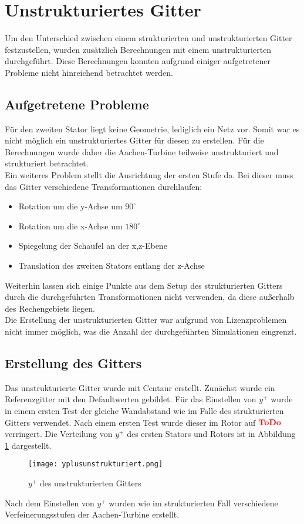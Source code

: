 \section{Unstrukturiertes Gitter}
Um den Unterschied zwischen einem strukturierten und unstrukturierten Gitter festzustellen, wurden zusätzlich Berechnungen mit einem unstrukturierten durchgeführt. Diese Berechnungen konnten aufgrund einiger aufgetretener Probleme nicht hinreichend betrachtet werden.

\subsection{Aufgetretene Probleme}
Für den zweiten Stator liegt keine Geometrie, lediglich ein Netz vor. Somit war es nicht möglich ein unstrukturiertes Gitter für diesen zu erstellen. Für die Berechnungen wurde daher die Aachen-Turbine teilweise unstrukturiert und strukturiert betrachtet.\\
Ein weiteres Problem stellt die Ausrichtung der ersten Stufe da.
Bei dieser muss das Gitter verschiedene Transformationen durchlaufen:
\begin{itemize}
\item Rotation um die y-Achse um $90^\circ$
\item Rotation um die x-Achse um $180^\circ$
\item Spiegelung der Schaufel an der x,z-Ebene
\item Translation des zweiten Stators entlang der z-Achse
\end{itemize}
Weiterhin lassen sich einige Punkte aus dem Setup des strukturierten Gitters durch die durchgeführten Transformationen nicht verwenden, da diese außerhalb des Rechengebiets liegen.\\
Die Erstellung der unstrukturierten Gitter war aufgrund von Lizenzproblemen nicht immer möglich, was die Anzahl der durchgeführten Simulationen eingrenzt.
\subsection{Erstellung des Gitters}
Das unstrukturierte Gitter wurde mit Centaur erstellt. Zunächst wurde ein Referenzgitter mit den Defaultwerten gebildet. Für das Einstellen von $y^+$ wurde in einem ersten Test der gleiche Wandabstand wie im Falle des strukturierten Gitters verwendet. Nach einem ersten Test wurde dieser im Rotor auf $\textcolor{red}{\textbf{ToDo}}$ verringert. Die Verteilung von $y^+$ des ersten Stators und Rotors ist in Abbildung \ref{yplusunstrukturiert} dargestellt.
\begin{figure}[htbp]
	\centering
	\texttt{[image: yplusunstrukturiert.png]}
	\caption{$y^+$ des unstrukturierten Gitters} \label{yplusunstrukturiert}
\end{figure}
Nach dem Einstellen von $y^+$ wurden wie im strukturierten Fall verschiedene Verfeinerungsstufen der Aachen-Turbine erstellt.
\tabelle
